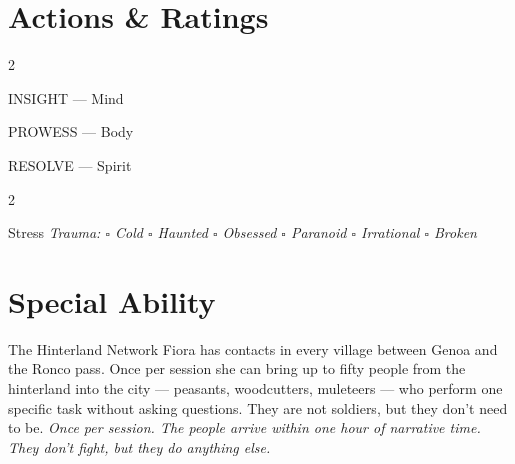 \section*{Actions \& Ratings}
\begin{multicols}{2}
\begin{attributoblock}[FieschiGreen]{INSIGHT --- Mind}
\end{attributoblock}
\begin{attributoblock}[FieschiGreen]{PROWESS --- Body}
\end{attributoblock}
\end{multicols}
\begin{attributoblock}[FieschiGreen]{RESOLVE --- Spirit}
  \begin{multicols}{2}
  \end{multicols}
\end{attributoblock}

\medskip
\begin{pgclockbox}{Stress \hfill {}}
\small\textit{Trauma: $\square$ Cold \quad $\square$ Haunted \quad $\square$ Obsessed \quad $\square$ Paranoid \quad $\square$ Irrational \quad $\square$ Broken}
\end{pgclockbox}

\section*{Special Ability}
\begin{fieschibox}{The Hinterland Network}
Fiora has contacts in every village between Genoa and the Ronco pass. Once per session
she can bring up to fifty people from the hinterland into the city --- peasants, woodcutters,
muleteers --- who perform one specific task without asking questions. They are not soldiers,
but they don't need to be.
\textit{Once per session. The people arrive within one hour of narrative time. They don't fight, but they do anything else.}
\end{fieschibox}

